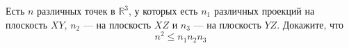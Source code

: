 \documentclass[a4paper, 12pt]{article}
\begin{document}
Есть $n$ различных точек в $\mathbb{R}^3$, у которых есть $n_1$ различных проекций на плоскость $XY$, $n_2$ --- на плоскость $XZ$ и $n_3$ --- на плоскость $YZ$. Докажите, что $$n^2\leq n_1n_2n_3$$
\end{document}
